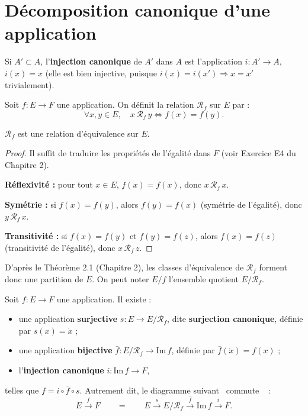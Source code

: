 \documentclass[a4paper,12pt,openany]{book}
\providecommand{\og}{\guillemotleft~}
\providecommand{\fg}{\ifhmode~\fi\guillemotright}
\begin{document}
\section{Décomposition canonique d'une application}


\begin{definition}
Si $A' \subset A$, l'\textbf{injection canonique} de $A'$ dans $A$ est
l'application $i : A' \to A$, $i(x)=x$ (elle est bien injective, puisque
$i(x)=i(x') \Rightarrow x=x'$ trivialement).
\end{definition}

\begin{definition}
Soit $f : E \to F$ une application. On définit la relation $\mathcal{R}_f$
sur $E$ par :
\[
\forall x,y \in E,\quad x\,\mathcal{R}_f\,y \iff f(x)=f(y).
\]
\end{definition}

\begin{proposition}[3.5]
$\mathcal{R}_f$ est une relation d'équivalence sur $E$.
\end{proposition}

\begin{proof}
Il suffit de traduire les propriétés de l'égalité dans $F$ (voir Exercice
E4 du Chapitre 2).

\textbf{Réflexivité :} pour tout $x\in E$, $f(x)=f(x)$, donc
$x\,\mathcal{R}_f\,x$.

\textbf{Symétrie :} si $f(x)=f(y)$, alors $f(y)=f(x)$ (symétrie de
l'égalité), donc $y\,\mathcal{R}_f\,x$.

\textbf{Transitivité :} si $f(x)=f(y)$ et $f(y)=f(z)$, alors $f(x)=f(z)$
(transitivité de l'égalité), donc $x\,\mathcal{R}_f\,z$.
\end{proof}

D'après le Théorème 2.1 (Chapitre 2), les classes d'équivalence de
$\mathcal{R}_f$ forment donc une partition de $E$. On peut noter $E/f$
l'ensemble quotient $E/\mathcal{R}_f$.

\begin{theoreme}
Soit $f : E \to F$ une application. Il existe :
\begin{itemize}
  \item une application \textbf{surjective} $s : E \to E/\mathcal{R}_f$,
  dite \textbf{surjection canonique}, définie par $s(x) = \dot x$ ;
  \item une application \textbf{bijective} $\bar f : E/\mathcal{R}_f \to
  \mathrm{Im}\,f$, définie par $\bar f(\dot x) = f(x)$ ;
  \item l'\textbf{injection canonique} $i : \mathrm{Im}\,f \to F$,
\end{itemize}
telles que $f = i \circ \bar f \circ s$. Autrement dit, le diagramme suivant
\og commute \fg{} :
\[
E \xrightarrow{\ f\ } F \qquad = \qquad
E \xrightarrow{\ s\ } E/\mathcal{R}_f \xrightarrow{\ \bar f\ } \mathrm{Im}\,f
\xrightarrow{\ i\ } F.
\]
\end{theoreme}
\end{document}
